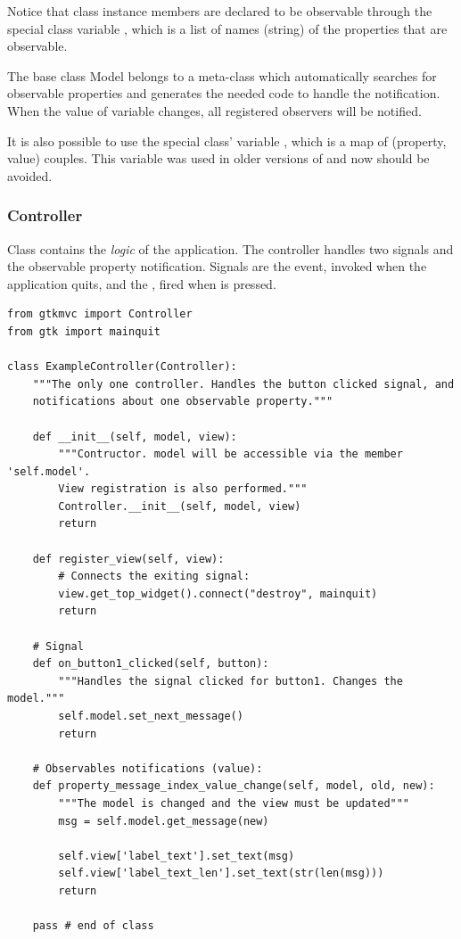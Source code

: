 Notice that class instance members are declared to be observable
through the special class variable ,
which is a list of names (string) of the properties that are
observable.

The base class Model belongs to a
meta-class which automatically searches for observable properties and
generates the needed code to handle the notification.  When the value
of variable  changes, all registered
observers will be notified.

It is also possible to use the special class' variable
, which is a map of (property, value)
couples. This variable was used in older versions of \gtkmvc and
now should be avoided.

\subsubsection{Controller}
Class  contains the \emph{logic} of the
application. The controller handles two signals and the observable
property notification. Signals are the  event,
invoked when the application quits, and the
, fired when  is
pressed.

{ \codesize 
\begin{verbatim} 
from gtkmvc import Controller
from gtk import mainquit

class ExampleController(Controller):
    """The only one controller. Handles the button clicked signal, and
    notifications about one observable property."""

    def __init__(self, model, view):
        """Contructor. model will be accessible via the member 'self.model'.
        View registration is also performed."""
        Controller.__init__(self, model, view)
        return

    def register_view(self, view):
        # Connects the exiting signal:
        view.get_top_widget().connect("destroy", mainquit)
        return

    # Signal
    def on_button1_clicked(self, button):
        """Handles the signal clicked for button1. Changes the model."""
        self.model.set_next_message()
        return

    # Observables notifications (value):
    def property_message_index_value_change(self, model, old, new):
        """The model is changed and the view must be updated"""
        msg = self.model.get_message(new)
        
        self.view['label_text'].set_text(msg)
        self.view['label_text_len'].set_text(str(len(msg)))
        return    

    pass # end of class
\end{verbatim}
}

